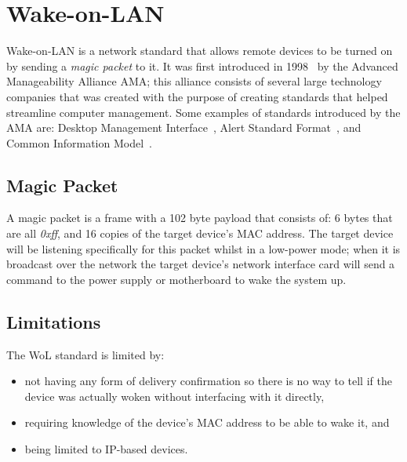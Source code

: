 
\section{Wake-on-LAN}

Wake-on-LAN is a network standard that allows remote devices to be turned on by sending a \textit{magic packet} to it. It was first introduced in 1998~\cite{noauthor_ibm_2012} by the Advanced Manageability Alliance AMA; this alliance consists of several large technology companies that was created with the purpose of creating standards that helped streamline computer management.
Some examples of standards introduced by the AMA are: Desktop Management Interface~\cite{noauthor_dmi_nodate}, Alert Standard Format~\cite{noauthor_asf_nodate}, and Common Information Model~\cite{noauthor_cim_nodate}.

\subsection{Magic Packet}

A magic packet is a frame with a 102 byte payload that consists of: 6 bytes that are all \textit{0xff}, and 16 copies of the target device's MAC address. The target device will be listening specifically for this packet whilst in a low-power mode; when it is broadcast over the network the target device's network interface card will send a command to the power supply or motherboard to wake the system up.

\subsection{Limitations}

The WoL standard is limited by:

\vspace{-2mm}
\begin{itemize}[noitemsep]
  \item not having any form of delivery confirmation so there is no way to tell if the device was actually woken without interfacing with it directly,
  \item requiring knowledge of the device's MAC address to be able to wake it, and
  \item being limited to IP-based devices.
\end{itemize}